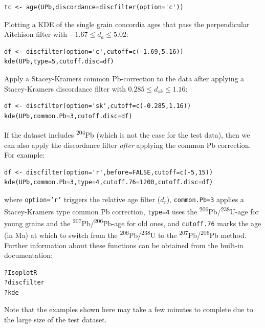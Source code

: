 \documentclass[gchron, manuscript]{copernicus}
\begin{document}
\begin{verbatim}
tc <- age(UPb,discordance=discfilter(option='c'))
\end{verbatim}

\noindent Plotting a KDE of the single grain concordia ages that pass
the perpendicular Aitchison filter with ${-1.67}\leq{d_a}\leq{5.02}$:

\begin{verbatim}
df <- discfilter(option='c',cutoff=c(-1.69,5.16))
kde(UPb,type=5,cutoff.disc=df)
\end{verbatim}

\noindent Apply a Stacey-Kramers common Pb-correction to the data after
applying a Stacey-Kramers discordance filter with
${0.285}\leq{d_{sk}}\leq{1.16}$:

\begin{verbatim}
df <- discfilter(option='sk',cutoff=c(-0.285,1.16))
kde(UPb,common.Pb=3,cutoff.disc=df)
\end{verbatim}

\noindent If the dataset includes \textsuperscript{204}Pb (which is not
the case for the test data), then we can also apply the discordance
filter \textit{after} applying the common Pb correction. For example:

\begin{verbatim}
df <- discfilter(option='r',before=FALSE,cutoff=c(-5,15))
kde(UPb,common.Pb=3,type=4,cutoff.76=1200,cutoff.disc=df)
\end{verbatim}

\noindent where \texttt{option='r'} triggers the relative age filter
($d_r$), \texttt{common.Pb=3} applies a Stacey-Kramers type common Pb
correction, \texttt{type=4} uses the
\textsuperscript{206}Pb/\textsuperscript{238}U-age for young grains
and the \textsuperscript{207}Pb/\textsuperscript{206}Pb-age for old
ones, and \texttt{cutoff.76} marks the age (in Ma) at which to switch
from the \textsuperscript{206}Pb/\textsuperscript{238}U to the
\textsuperscript{207}Pb/\textsuperscript{206}Pb method. Further
information about these functions can be obtained from the built-in
documentation:

\begin{verbatim}
?IsoplotR
?discfilter
?kde
\end{verbatim}

\noindent Note that the examples shown here may take a few minutes to
complete due to the large size of the test dataset.

\conclusions
\label{sec:conclusions}
\end{document}

